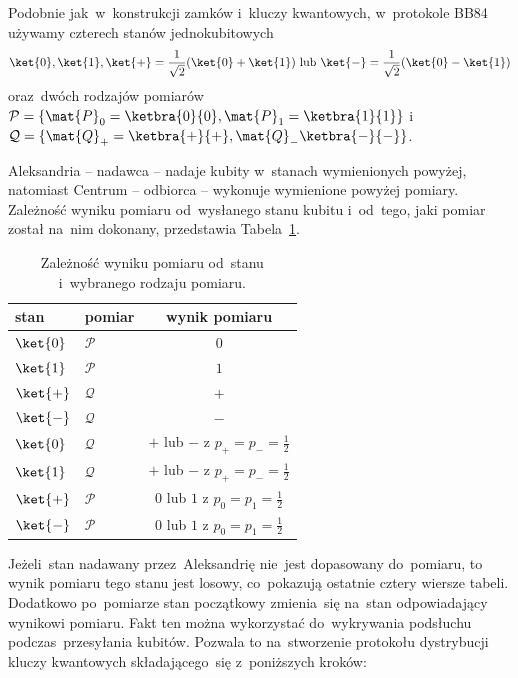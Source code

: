 Podobnie jak~w~konstrukcji zamków i~kluczy kwantowych, w~protokole BB84 używamy
czterech stanów jednokubitowych
$$
	\ket{0}, \ket{1}, \ket{+}=\frac{1}{\sqrt{2}}(\ket{0}+\ket{1})
	\text{ lub } \ket{-}=\frac{1}{\sqrt{2}}(\ket{0}-\ket{1})
$$
oraz~dwóch rodzajów pomiarów
$\mathcal{P}=\{\mat{P}_0=\ketbra{0}{0}, \mat{P}_1=\ketbra{1}{1}\}$ i
$\mathcal{Q}=\{\mat{Q}_+=\ketbra{+}{+}, \mat{Q}_-\ketbra{-}{-}\}$.

Aleksandria -- nadawca -- nadaje kubity w~stanach wymienionych powyżej, natomiast Centrum
-- odbiorca -- wykonuje wymienione powyżej pomiary. Zależność wyniku
pomiaru od~wysłanego stanu kubitu i~od~tego, jaki pomiar został na~nim dokonany, przedstawia
Tabela~\ref{tab:bb84}.

\begin{table}[h]
	\begin{center}
		\begin{tabular}{llc}
			stan      & pomiar        & wynik pomiaru                       \\
			\toprule
			$\ket{0}$ & $\mathcal{P}$ & $0$                                 \\
			\midrule
			$\ket{1}$ & $\mathcal{P}$ & $1$                                 \\
			\midrule
			$\ket{+}$ & $\mathcal{Q}$ & $+$                                 \\
			\midrule
			$\ket{-}$ & $\mathcal{Q}$ & $-$                                 \\
			\midrule
			$\ket{0}$ & $\mathcal{Q}$ & $+$ lub $-$ z $p_+=p_-=\frac{1}{2}$ \\
			\midrule
			$\ket{1}$ & $\mathcal{Q}$ & $+$ lub $-$ z $p_+=p_-=\frac{1}{2}$ \\
			\midrule
			$\ket{+}$ & $\mathcal{P}$ & $0$ lub $1$ z $p_0=p_1=\frac{1}{2}$ \\
			\midrule
			$\ket{-}$ & $\mathcal{P}$ & $0$ lub $1$ z $p_0=p_1=\frac{1}{2}$ \\
		\end{tabular}
		\caption{Zależność wyniku pomiaru od~stanu i~wybranego rodzaju pomiaru.}
		\label{tab:bb84}
	\end{center}
\end{table}

Jeżeli~stan nadawany przez~Aleksandrię nie~jest dopasowany do~pomiaru,
to wynik pomiaru tego stanu jest losowy, co~pokazują ostatnie cztery wiersze
tabeli. Dodatkowo po~pomiarze stan początkowy zmienia~się na~stan
odpowiadający wynikowi pomiaru. Fakt ten można wykorzystać do~wykrywania
podsłuchu podczas~przesyłania kubitów. Pozwala to na~stworzenie
protokołu dystrybucji kluczy kwantowych składającego~się z~poniższych
kroków:

